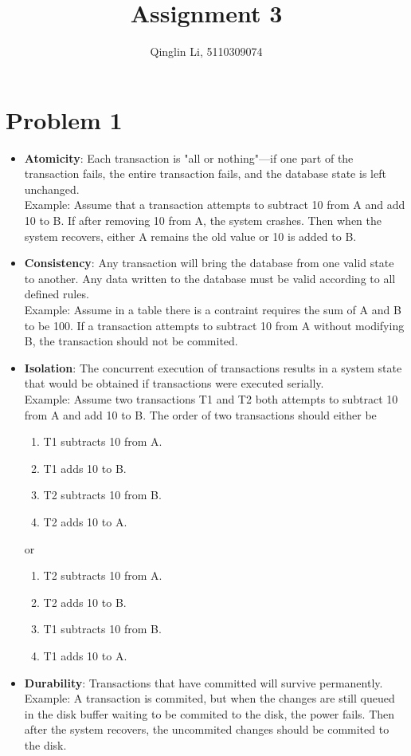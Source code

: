 \documentclass[a4paper,11pt]{article}
\begin{document}
\pagestyle{fancy}
\rfoot{\thepage}
\setlength{\parskip}{0.7ex plus0.2ex minus0.2ex}
\cfoot{\empty}
\lhead{\empty}


\title{Assignment 3}
\author{Qinglin Li, 5110309074}
\date{}
\maketitle

\thispagestyle{fancy}

\section*{Problem 1}
\begin{itemize}
\item
\textbf{Atomicity}: Each transaction is "all or nothing"---if one part of the transaction fails, the entire transaction fails, and the database state is left unchanged.\\
Example: Assume that a transaction attempts to subtract 10 from A and add 10 to B. If after removing 10 from A, the system crashes. Then when the system recovers, either A remains the old value or 10 is added to B.
\item
\textbf{Consistency}: Any transaction will bring the database from one valid state to another. Any data written to the database must be valid according to all defined rules.\\
Example: Assume in a table there is a contraint requires the sum of A and B to be 100. If a transaction attempts to subtract 10 from A without modifying B, the transaction should not be commited.
\item
\textbf{Isolation}: The concurrent execution of transactions results in a system state that would be obtained if transactions were executed serially.\\
Example: Assume two transactions T1 and T2 both attempts to subtract 10 from A and add 10 to B. The order of two transactions should either be 
\begin{enumerate}
\item T1 subtracts 10 from A.
\item T1 adds 10 to B.
\item T2 subtracts 10 from B.
\item T2 adds 10 to A.
\end{enumerate}
or 
\begin{enumerate}
\item T2 subtracts 10 from A.
\item T2 adds 10 to B.
\item T1 subtracts 10 from B.
\item T1 adds 10 to A.
\end{enumerate}
\item
\textbf{Durability}: Transactions that have committed will survive permanently.\\
Example: A transaction is commited, but when the changes are still queued in the disk buffer waiting to be commited to the disk, the power fails. Then after the system recovers, the uncommited changes should be commited to the disk.
\end{itemize}
\newpage
\end{document}
